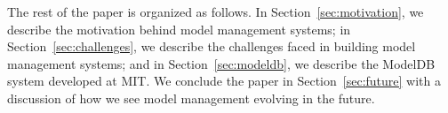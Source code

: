 \documentclass[11pt]{article}
\newcommand{\mpv}[1]{\textcolor{blue}{mpv: #1}}
\newcommand{\mlwfs}{ML workflows\xspace}
\newcommand{\mdb}{{\sc ModelDB}\xspace}
\newcommand{\wf}{workflow\xspace}
\newcommand{\Dss}{Data scientists\xspace}
\newcommand{\dss}{data scientists\xspace}
\newcommand{\mldevs}{ML developers\xspace}
\begin{document}

The rest of the paper is organized as follows.
In Section~\ref{sec:motivation}, we describe the motivation behind model management systems; in Section~\ref{sec:challenges}, we describe the challenges faced in building model management systems; and in Section~\ref{sec:modeldb}, we describe the \mdb system developed at MIT.
We conclude the paper in Section~\ref{sec:future} with a discussion of how we see model management evolving in the future.

\end{document}
